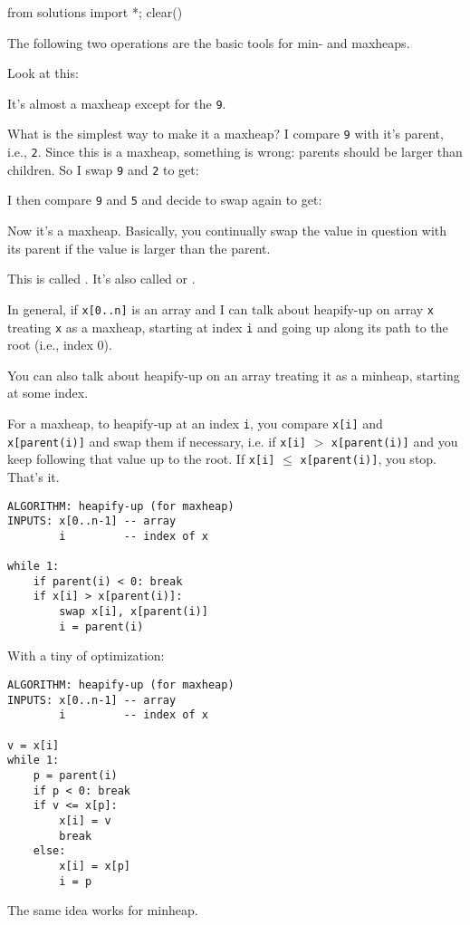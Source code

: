 \begin{python0}
from solutions import *; clear()
\end{python0}

The following two operations are the basic tools for min- and maxheaps.

Look at this:



It's almost a maxheap except for the \verb!9!.

What is the simplest way to make it a maxheap?
I compare \verb!9! with it's parent, i.e., \verb!2!.
Since this is a maxheap, something is wrong:
parents should be larger than children.
So I swap \verb!9! and \verb!2! to get:



I then compare \verb!9! and \verb!5! and decide to swap again to get:



Now it's a maxheap.
Basically, you continually swap the value in question with
its parent if the value is larger than the parent.

This is called
.
It's also called
 or
.


In general, if \verb!x[0..n]! is an array
and I can talk about heapify-up on array \verb!x!
treating \verb!x! as a maxheap,
starting at index \verb!i! and going up
along its path to the root (i.e., index 0).

You can also talk about heapify-up on an array
treating it as a minheap,
starting at some index.

For a maxheap, to heapify-up at an index \verb!i!, you compare
\verb!x[i]! and \verb!x[parent(i)]!
and swap them if necessary, i.e. if \verb!x[i]! $>$ \verb!x[parent(i)]!
and you keep following that value up to the root.
If \verb!x[i]! $\leq$ \verb!x[parent(i)]!, you stop.
That's it.

\begin{Verbatim}[frame=single]
ALGORITHM: heapify-up (for maxheap)
INPUTS: x[0..n-1] -- array
        i         -- index of x

while 1:
    if parent(i) < 0: break
    if x[i] > x[parent(i)]:
        swap x[i], x[parent(i)]
        i = parent(i)
\end{Verbatim}

With a tiny of optimization:
\begin{Verbatim}[frame=single]
ALGORITHM: heapify-up (for maxheap)
INPUTS: x[0..n-1] -- array
        i         -- index of x

v = x[i]
while 1:
    p = parent(i)
    if p < 0: break
    if v <= x[p]:
        x[i] = v
        break
    else:
        x[i] = x[p]
        i = p
\end{Verbatim}

The same idea works for minheap.

